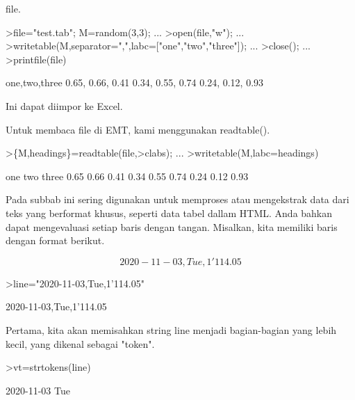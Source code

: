 \documentclass[a4paper,10pt]{article}
\begin{document}
\begin{eulernotebook}
\begin{eulercomment}
\begin{eulercomment}
\begin{eulercomment}
\begin{eulercomment}
\begin{eulercomment}
\begin{eulercomment}
\begin{eulercomment}
\begin{eulercomment}
\begin{eulercomment}
\begin{eulercomment}
\begin{eulercomment}
\begin{eulercomment}
\begin{eulercomment}
\begin{eulercomment}
\begin{eulercomment}
file.
\end{eulercomment}
\begin{eulerprompt}
>file="test.tab"; M=random(3,3);  ...
>open(file,"w");  ...
>writetable(M,separator=",",labc=["one","two","three"]);  ...
>close(); ...
>printfile(file)
\end{eulerprompt}
\begin{euleroutput}
  one,two,three
        0.65,      0.66,      0.41
        0.34,      0.55,      0.74
        0.24,      0.12,      0.93
\end{euleroutput}
\begin{eulercomment}
Ini dapat diimpor ke Excel.

Untuk membaca file di EMT, kami menggunakan readtable().
\end{eulercomment}
\begin{eulerprompt}
>\{M,headings\}=readtable(file,>clabs); ...
>writetable(M,labc=headings)
\end{eulerprompt}
\begin{euleroutput}
         one       two     three
        0.65      0.66      0.41
        0.34      0.55      0.74
        0.24      0.12      0.93
\end{euleroutput}
\begin{eulercomment}
Pada subbab ini sering digunakan untuk memproses atau mengekstrak data
dari teks yang berformat khusus, seperti data tabel dallam HTML. Anda
bahkan dapat mengevaluasi setiap baris dengan tangan. Misalkan, kita
memiliki baris dengan format berikut.\\
\end{eulercomment}
\begin{eulerformula}
\[
2020-11-03, Tue, 1'114.05
\]
\end{eulerformula}
\begin{eulerprompt}
>line="2020-11-03,Tue,1'114.05"
\end{eulerprompt}
\begin{euleroutput}
  2020-11-03,Tue,1'114.05
\end{euleroutput}
\begin{eulercomment}
Pertama, kita akan memisahkan string line menjadi bagian-bagian yang
lebih kecil, yang dikenal sebagai "token".
\end{eulercomment}
\begin{eulerprompt}
>vt=strtokens(line)
\end{eulerprompt}
\begin{euleroutput}
  2020-11-03
  Tue

\end{euleroutput}
\end{eulercomment}
\end{eulercomment}
\end{eulercomment}
\end{eulercomment}
\end{eulercomment}
\end{eulercomment}
\end{eulercomment}
\end{eulercomment}
\end{eulercomment}
\end{eulercomment}
\end{eulercomment}
\end{eulercomment}
\end{eulercomment}
\end{eulercomment}
\end{eulernotebook}
\end{document}
